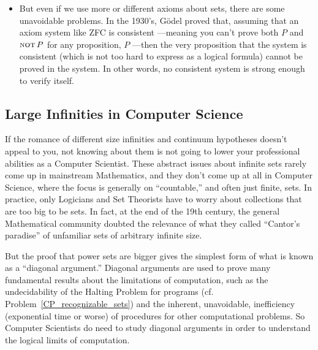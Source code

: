 \begin{itemize}
\item But even if we use more or different axioms about sets, there are
  some unavoidable problems.  In the 1930's, G\"{o}del proved that,
  assuming that an axiom system like ZFC is consistent ---meaning you
  can't prove both $P$ and $\mathop{\mathrm{\textsc{not}}} P$ for any proposition, $P$ ---then the
  very proposition that the system is consistent (which is not too hard to
  express as a logical formula) cannot be proved in the system.  In other
  words, no consistent system is strong enough to verify itself.
  
\end{itemize}

\subsection{Large Infinities in Computer Science}

If the romance of different size infinities and continuum hypotheses
doesn't appeal to you, not knowing about them is not going to lower your
professional abilities as a Computer Scientist.  These abstract issues
about infinite sets rarely come up in mainstream Mathematics, and they
don't come up at all in Computer Science, where the focus is generally on
``countable,'' and often just finite, sets.  In practice, only Logicians
and Set Theorists have to worry about collections that are too big to be
sets.  In fact, at the end of the 19th century, the general Mathematical
community doubted the relevance of what they called ``Cantor's paradise''
of unfamiliar sets of arbitrary infinite size.

But the proof that power sets are bigger gives the simplest form of what
is known as a ``diagonal argument.''  Diagonal arguments are used to prove
many fundamental results about the limitations of computation, such as the
undecidability of the Halting Problem for programs (cf.
Problem~\ref{CP_recognizable_sets})
and the inherent, unavoidable, inefficiency (exponential
time or worse) of procedures for other computational problems.  So
Computer Scientists do need to study diagonal arguments in order to
understand the logical limits of computation.

\begin{problems}
\classproblems
{}
\end{problems}

